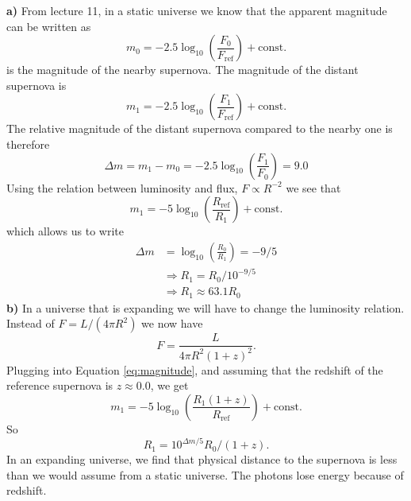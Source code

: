\documentclass[a4paper,12pt]{article}
\theoremstyle{remark}
\newcommand{\mrm}[1]{\mathrm{#1}}
\renewcommand{\=}[1]{\stackrel{#1}{=}} %
\theoremstyle{plain}
\theoremstyle{definition}
\begin{document}
\textbf{a)} From lecture 11, in a static universe we know that the apparent magnitude can be written as
\begin{equation}
m _0 = -2.5 \log _{10}  \left( \frac{F_0}{F _\mrm{ref}} \right) + \mrm{const}.
\end{equation} 
is the magnitude of the nearby supernova. The magnitude of the distant supernova is 
\begin{equation}
m _1 = -2.5 \log _{10}  \left( \frac{F_1}{F _\mrm{ref}} \right) + \mrm{const}.
\end{equation}
The relative magnitude of the distant supernova compared to the nearby one is therefore 
\begin{equation}
\Delta m = m _1 - m _0 = -2.5 \log _{10}  \left( \frac{F_1}{F _0} \right) = 9.0
\end{equation}
Using the relation between luminosity and flux, $F \propto R^{-2}$ we see that 
\begin{equation}
m _1 = -5 \log _{10}  \left( \frac{R_\mrm{ref}}{R _1} \right) + \mrm{const}.
\label{eq:magnitude}
\end{equation}
which allows us to write
\begin{align}
\Delta m &=  \log _{10}  \left( \frac{R_0}{R _1} \right) = -9/5 \\
& \Rightarrow R_1 = R_0/10^{-9/5} \\
& \Rightarrow R_1 \approx 63.1 R_0
\end{align}
\textbf{b)} In a universe that is expanding we will have to change the luminosity relation. Instead of $F = L/(4\pi R^{2})$ we now have 
\begin{equation}
F = \frac{L}{4\pi R^{2} (1+z)^{2}}.
\end{equation}
Plugging into Equation \ref{eq:magnitude}, and assuming that the redshift of the reference supernova is $z \approx 0.0$, we get
\begin{equation}
m _1 = -5 \log _{10}  \left( \frac{R_1(1+z)}{R _\mrm{ref}} \right) + \mrm{const}.
\end{equation}
So
\begin{equation}
R_1 = 10^{\Delta m/5} R_0 / (1+z).
\end{equation}
In an expanding universe, we find that physical distance to the supernova is less than we would assume from a static universe. The photons lose energy because of redshift.
 
\end{document}
